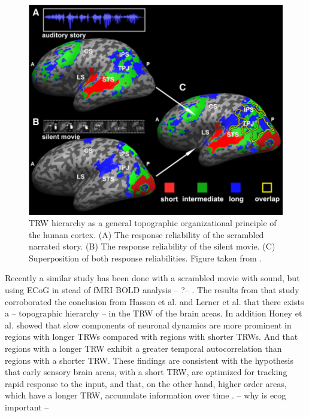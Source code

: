 \begin{figure}[!ht]
\label{fig:timescale_hierarchy_story_movie}
\centering
\includegraphics[scale=0.38]{hierarchy_figures/temporal_hierarchy_story_movie}
\caption{
TRW hierarchy as a general topographic organizational principle of the human cortex.
(A) The response reliability of the scrambled narrated story. (B) The response reliability of the silent movie. (C) Superposition of both response reliabilities. 
Figure taken from \cite{lerner2011topographic}.
}
\end{figure}
Recently a similar study has been done with a scrambled movie with sound, but using ECoG in stead of fMRI BOLD analysis -- ?-- \cite{honey2012slow}. The results from that study corroborated the conclusion from Hasson et al. and Lerner et al. that there exists a -- topographic hierarchy -- in the TRW of the brain areas. In addition Honey et al. showed that slow components of neuronal dynamics are more prominent in regions with longer TRWs compared with regions with shorter TRWs. And that regions with a longer TRW exhibit a greater temporal autocorrelation than regions with a shorter TRW. These findings are consistent with the hypothesis that early sensory brain areas, with a short TRW, are optimized for tracking rapid response to the input, and that, on the other hand, higher order areas, which have a longer TRW, accumulate information over time \cite{huk2005neural, ogawa2010differential, romo1999neuronal, shadlen2001neural, wang2002probabilistic}.
-- why is ecog important -- 


